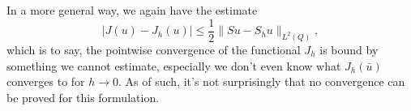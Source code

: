 \documentclass[../thesis.tex]{subfiles}
\begin{document}
In a more general way, we again have the estimate
\[
	|J(u) - J_h(u)| \leq \frac{1}{2} \| S u - S_h u \|_{L^2(Q)},
\]
which is to say, the pointwise convergence of the functional $J_h$ is bound by something we cannot estimate, especially we don't even know what $J_h(\bar{u})$ converges to for $h \to 0$.
As of such, it's not surprisingly that no convergence can be proved for this formulation.
\end{document}
